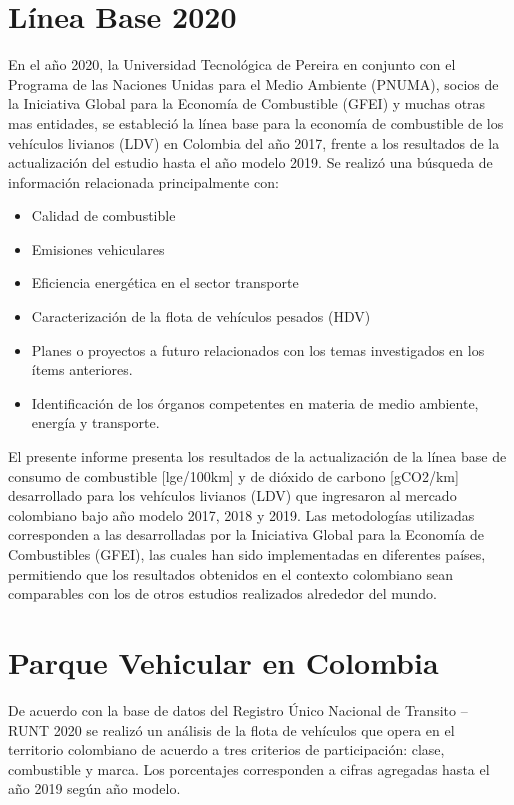 \section{Línea Base 2020}

En el año 2020, la Universidad Tecnológica de Pereira en conjunto con el Programa de las Naciones Unidas para el Medio Ambiente (PNUMA), socios de la Iniciativa Global para la Economía de Combustible (GFEI) y muchas otras mas entidades, se estableció la línea base para la economía de combustible de los vehículos livianos (LDV) en Colombia del año 2017, frente a los resultados de la actualización del estudio hasta el año modelo 2019. Se realizó una búsqueda de información relacionada principalmente con:

\begin{itemize}
\item Calidad de combustible
\item Emisiones vehiculares
\item Eficiencia energética en el sector transporte
\item Caracterización de la flota de vehículos pesados (HDV)
\item Planes o proyectos a futuro relacionados con los temas investigados en los ítems
anteriores.
\item Identificación de los órganos competentes en materia de medio ambiente, energía y
transporte.
\end{itemize}

El presente informe presenta los resultados de la actualización de la línea base de consumo de combustible [lge/100km] y de dióxido de carbono [gCO2/km] desarrollado para los vehículos livianos (LDV) que ingresaron al mercado colombiano bajo año modelo 2017, 2018 y 2019. Las metodologías utilizadas corresponden a las desarrolladas por la Iniciativa Global para la Economía de Combustibles (GFEI), las cuales han sido implementadas en diferentes países, permitiendo que los resultados obtenidos en el contexto colombiano sean comparables con los de otros estudios realizados alrededor del mundo. \cite{Baseline_Pereira_2020}

\section{Parque Vehicular en Colombia}

De acuerdo con la base de datos del Registro Único Nacional de Transito – RUNT 2020 se realizó un análisis de la flota de vehículos que opera en el territorio colombiano de acuerdo a tres criterios de participación: clase, combustible y marca. Los porcentajes corresponden a cifras agregadas hasta el año 2019 según año modelo.

